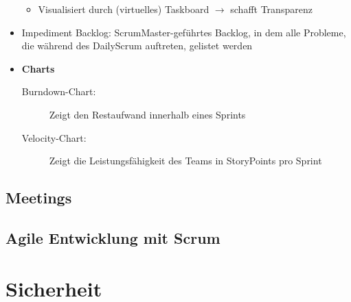 \begin{itemize}
\begin{itemize}
		\item Visualisiert durch (virtuelles) Taskboard \(\rightarrow\) schafft Transparenz
	\end{itemize}
	\item Impediment Backlog: ScrumMaster-geführtes Backlog, in dem alle Probleme, die während des DailyScrum auftreten, gelistet werden
	\item \textbf{Charts}
	\begin{description}
		\item[Burndown-Chart:] Zeigt den Restaufwand innerhalb eines Sprints
		\item[Velocity-Chart:] Zeigt die Leistungsfähigkeit des Teams in StoryPoints pro Sprint
	\end{description}
\end{itemize}


\subsection{Meetings}


\subsection{Agile Entwicklung mit Scrum}



\section{Sicherheit}